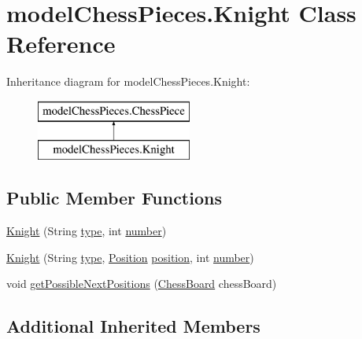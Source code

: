 \hypertarget{classmodel_chess_pieces_1_1_knight}{\section{model\+Chess\+Pieces.\+Knight Class Reference}
\label{classmodel_chess_pieces_1_1_knight}
}
Inheritance diagram for model\+Chess\+Pieces.\+Knight\+:\begin{figure}[H]
\begin{center}
\leavevmode
\includegraphics[height=2.000000cm]{classmodel_chess_pieces_1_1_knight}
\end{center}
\end{figure}
\subsection*{Public Member Functions}
\begin{DoxyCompactItemize}
\item 
\hyperlink{classmodel_chess_pieces_1_1_knight_a147ddcbdf9160932c8b0b386db3954eb}{Knight} (String \hyperlink{classmodel_chess_pieces_1_1_chess_piece_a195487ca88c197af7c1604247be31db2}{type}, int \hyperlink{classmodel_chess_pieces_1_1_chess_piece_a979e63b99128333883acedc38d25dc87}{number})
\item 
\hyperlink{classmodel_chess_pieces_1_1_knight_ac3d5048db997f503429d11d455db2c42}{Knight} (String \hyperlink{classmodel_chess_pieces_1_1_chess_piece_a195487ca88c197af7c1604247be31db2}{type}, \hyperlink{classmodel_core_1_1_position}{Position} \hyperlink{classmodel_chess_pieces_1_1_chess_piece_a3d4362d5b28f6edb14161196d9c6807d}{position}, int \hyperlink{classmodel_chess_pieces_1_1_chess_piece_a979e63b99128333883acedc38d25dc87}{number})
\item 
void \hyperlink{classmodel_chess_pieces_1_1_knight_a0fce4a797e3f401539507c0aca51760b}{get\+Possible\+Next\+Positions} (\hyperlink{classmodel_core_1_1_chess_board}{Chess\+Board} chess\+Board)
\end{DoxyCompactItemize}
\subsection*{Additional Inherited Members}


